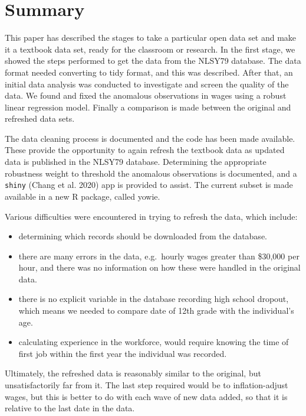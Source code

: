 \documentclass[12pt]{article}
\providecommand{\tightlist}{%
  \setlength{\itemsep}{0pt}\setlength{\parskip}{0pt}}
\begin{document}
\hypertarget{summary}{%
\section{Summary}\label{summary}}

This paper has described the stages to take a particular open data set and make it a textbook data set, ready for the classroom or research. In the first stage, we showed the steps performed to get the data from the NLSY79 database. The data format needed converting to tidy format, and this was described. After that, an initial data analysis was conducted to investigate and screen the quality of the data. We found and fixed the anomalous observations in wages using a robust linear regression model. Finally a comparison is made between the original and refreshed data sets.

The data cleaning process is documented and the code has been made available. These provide the opportunity to again refresh the textbook data as updated data is published in the NLSY79 database.
Determining the appropriate robustness weight to threshold the anomalous observations is documented, and a \texttt{shiny} (Chang et al. 2020) app is provided to assist.
The current subset is made available in a new R package, called yowie.

Various difficulties were encountered in trying to refresh the data, which include:

\begin{itemize}
\tightlist
\item
  determining which records should be downloaded from the database.
\item
  there are many errors in the data, e.g.~hourly wages greater than \$30,000 per hour, and there was no information on how these were handled in the original data.
\item
  there is no explicit variable in the database recording high school dropout, which means we needed to compare date of 12th grade with the individual's age.
\item
  calculating experience in the workforce, would require knowing the time of first job within the first year the individual was recorded.
\end{itemize}

Ultimately, the refreshed data is reasonably similar to the original, but unsatisfactorily far from it. The last step required would be to inflation-adjust wages, but this is better to do with each wave of new data added, so that it is relative to the last date in the data.
\end{document}
